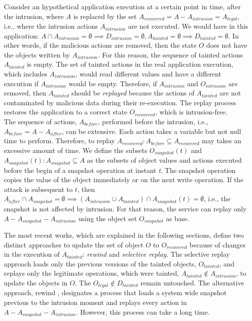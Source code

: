 Consider an hypothetical application execution at a certain point in time, after the intrusion, where $A$ is replaced by the set $A_{recovered} = A - A_{intrusion} = A_{legal}$, i.e., where the intrusion actions $A_{intrusion}$ are not executed. We would have in this application: $A \cap A_{intrusion} = \emptyset \implies D_{intrusion} = \emptyset, A_{tainted} = \emptyset \implies D_{tainted} = \emptyset$. In other words, if the malicious actions are removed, then the state $O$ does not have the objects written by $A_{intrusion}$. For this reason, the sequence of tainted actions $A_{tainted}$ is empty. The set of tainted actions in the real application execution, which includes $A_{intrusion}$, would read different values and have a different execution if $A_{intrusion}$ would be empty. Therefore, if $A_{intrusion}$ and $O_{intrusion}$ are removed, then $A_{tainted}$ should be \emph{replayed} because the actions of $A_{tainted}$ are not contaminated by malicious data during their re-execution. The replay process restores the application to a correct state $O_{recovered}$, which is intrusion-free.\\

The sequence of actions, $A_{before}$, performed before the intrusion, i.e., $A_{before} = A - A_{after}$, can be extensive. Each action takes a variable but not null time to perform. Therefore, to replay $A_{recovered} : A_{before} \subseteq A_{recovered} $ may takes an excessive amount of time. We define the subsets $O_{snapshot}(t)$ and $A_{snapshot}(t) : A_{snapshot} \subseteq A$ as the subsets of object values and actions executed before the begin of a snapshot operation at instant \textit{t}. The snapshot operation copies the value of the object immediately or on the next write operation. If the attack is subsequent to $t$, then $A_{after} \cap A_{snapshot} = \emptyset \implies (A_{intrusion} \cup A_{tainted}) \cap A_{snapshot}(t) = \emptyset$, i.e., the snapshot is not affected by intrusion. For that reason, the service can replay only $A-A_{snapshot}-A_{intrusion}$ using the object set $O_{snapshot}$ as base. 


The most recent works, which are explained in the following sections, define two distinct approaches to update the set of object $O$ to $O_{recovered}$ because of changes in the execution of $A_{tainted}$: \textit{rewind} and \textit{selective replay}. The selective replay approach loads only the previous versions of the tainted objects, $O_{tainted}$, and replays only the legitimate operations, which were tainted, $A_{tainted} \notin A_{intrusion}$, to update the objects in $O$. The $O_{legal} \notin D_{tainted}$ remain untouched. The alternative approach, rewind \cite{Brownc}, designates a process that loads a system wide snapshot previous to the intrusion moment and replays every action in $A-A_{snapshot}-A_{intrusion}$. However, this process can take a long time. \\


